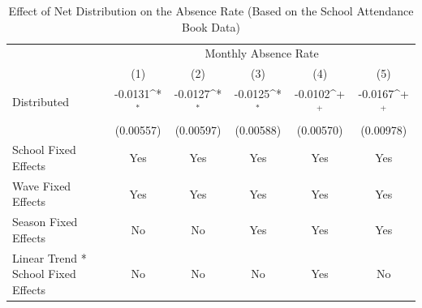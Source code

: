 \documentclass[fleqn,11pt]{article}
\newcommand{\sym}[1]{\rlap{$#1$}}
\def\sym#1{\ifmmode^{#1}\else\(^{#1}\)\fi
}
\begin{document}
\begin{table}[h]
\caption{Effect of Net Distribution on the Absence Rate (Based on the School Attendance
Book Data)}
\label{t:olsabsper_dailyattend_monthly_withtrend_child_app}\centering
\begin{adjustbox}{max width=\textwidth}
\begin{threeparttable}
\begin{tabular}{l*{5}{c}}
\hline\hline
&\multicolumn{5}{c}{Monthly Absence Rate}\\ \cmidrule(lr){2-6}
                    &\multicolumn{1}{c}{(1)}&\multicolumn{1}{c}{(2)}&\multicolumn{1}{c}{(3)}&\multicolumn{1}{c}{(4)}&\multicolumn{1}{c}{(5)}\\\hline
Distributed          &     -0.0131\sym{*}  &     -0.0127\sym{*}  &     -0.0125\sym{*}  &     -0.0102\sym{+}  &     -0.0167\sym{+}  \\
            &    (0.00557)         &     (0.00597)         &     (0.00588)         &     (0.00570)         &     (0.00978)         \\

School Fixed Effects           &         Yes         &         Yes         &         Yes         &         Yes         &         Yes         \\

Wave Fixed Effects            &         Yes         &         Yes         &         Yes         &         Yes         &         Yes         \\

Season Fixed Effects            &          No         &          No         &         Yes         &         Yes         &          Yes         \\

Linear Trend * School Fixed Effects &          No         &          No         &          No         &         Yes         &          No         \\


\end{tabular}
\end{threeparttable}
\end{adjustbox}
\end{table}
\end{document}
